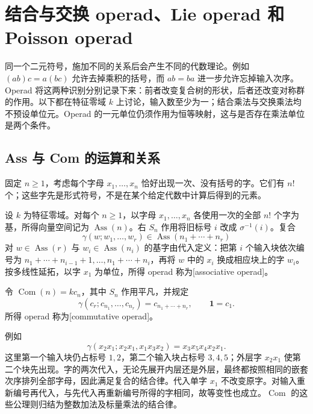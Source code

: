 
\section{结合与交换 operad、Lie operad 和 Poisson operad}
\label{b4:sec:G02}

同一个二元符号，施加不同的关系后会产生不同的代数理论。例如 \((ab)c=a(bc)\) 允许去掉乘积的括号，而 \(ab=ba\) 进一步允许忘掉输入次序。Operad 将这两种识别分别记录下来：前者改变复合树的形状，后者还改变对称群的作用。以下都在特征零域 \(k\) 上讨论，输入数至少为一；结合乘法与交换乘法均不预设单位元。Operad 的一元单位仍须作用为恒等映射，这与是否存在乘法单位是两个条件。

\subsection{Ass 与 Com 的运算和关系}
\label{b4:subsec:G02:01}

固定 \(n\ge1\)，考虑每个字母 \(x_1,\ldots,x_n\) 恰好出现一次、没有括号的字。它们有 \(n!\) 个；这些字先是形式符号，不是在某个给定代数中计算后得到的元素。

\begin{definition}\label{b4:def:ass-com-operads}
	设 \(k\) 为特征零域。对每个 \(n\ge1\)，以字母 \(x_1,\ldots,x_n\) 各使用一次的全部 \(n!\) 个字为基，所得向量空间记为 \(\operatorname{Ass}(n)\)。右 \(S_n\) 作用将旧标号 \(i\) 改成 \(\sigma^{-1}(i)\)。复合
	\[
		\gamma(w;w_1,\ldots,w_r)\in\operatorname{Ass}(n_1+\cdots+n_r)
	\]
	对 \(w\in\operatorname{Ass}(r)\) 与 \(w_i\in\operatorname{Ass}(n_i)\) 的基字由代入定义：把第 \(i\) 个输入块依次编号为 \(n_1+\cdots+n_{i-1}+1,\ldots,n_1+\cdots+n_i\)，再将 \(w\) 中的 \(x_i\) 换成相应块上的字 \(w_i\)。按多线性延拓，以字 \(x_1\) 为单位，所得 operad 称为[associative operad]。

	令 \(\operatorname{Com}(n)=k c_n\)，其中 \(S_n\) 作用平凡，并规定
	\[
		\gamma(c_r;c_{n_1},\ldots,c_{n_r})=c_{n_1+\cdots+n_r},
		\qquad \mathbf1=c_1.
	\]
	所得 operad 称为[commutative operad]。
\end{definition}

例如
\[
	\gamma(x_2x_1;x_2x_1,x_1x_3x_2)=x_3x_5x_4x_2x_1.
\]
这里第一个输入块仍占标号 \(1,2\)，第二个输入块占标号 \(3,4,5\)；外层字 \(x_2x_1\) 使第二个块先出现。字的两次代入，无论先展开内层还是外层，最终都按照相同的嵌套次序排列全部字母，因此满足复合的结合律。代入单字 \(x_1\) 不改变原字。对输入重新编号再代入，与先代入再重新编号所得的字相同，故等变性也成立。\(\operatorname{Com}\) 的这些公理则归结为整数加法及标量乘法的结合律。

